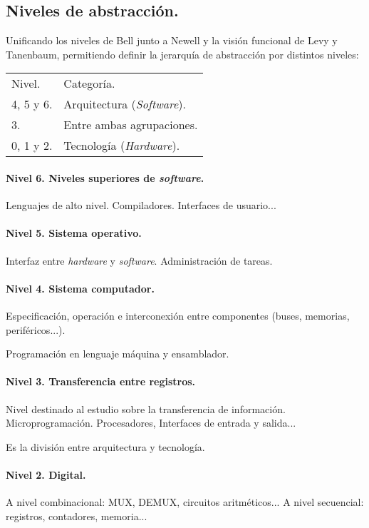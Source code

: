 \documentclass{article}
\begin{document}
\begin{multicols}{2}
		\subsection{Niveles de abstracción.}
		Unificando los niveles de Bell junto a Newell y la visión funcional de Levy y Tanenbaum, permitiendo definir la jerarquía de abstracción por distintos niveles:
		 \newline
		 \newline
		\begin{tabular}{ll}
			Nivel. & Categoría. \\
			4, 5 y 6. & Arquitectura (\textit{Software}). \\
			3. & Entre ambas agrupaciones. \\
			0, 1 y 2. & Tecnología (\textit{Hardware}). \\
		\end{tabular}
		
		\columnbreak
		
		\paragraph{Nivel 6. Niveles superiores de \textit{software}.}
		Lenguajes de alto nivel. Compiladores. Interfaces de usuario... 
		\paragraph{Nivel 5. Sistema operativo.}
		Interfaz entre \textit{hardware} y \textit{software}. Administración de tareas.
		\paragraph{Nivel 4. Sistema computador.}
		Especificación, operación e interconexión entre componentes (buses, memorias, periféricos...).
		
		Programación en lenguaje máquina y ensamblador.
		\paragraph{Nivel 3. Transferencia entre registros.}
		Nivel destinado al estudio sobre la transferencia de información. Microprogramación. Procesadores, Interfaces de entrada y salida... 
		
		Es la división entre arquitectura y tecnología.
		\paragraph{Nivel 2. Digital.}
		A nivel combinacional: MUX, DEMUX, circuitos aritméticos... 
		A nivel secuencial: registros, contadores, memoria...

\end{multicols}
\end{document}

